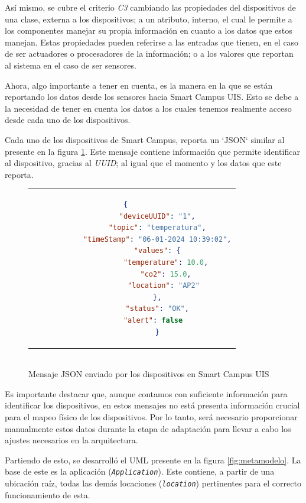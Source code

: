 Así mismo, se cubre el criterio \textit{C3} cambiando las propiedades del dispositivos de una clase, externa a los dispositivos; a un atributo, interno, el cual le permite a los componentes manejar su propia información en cuanto a los datos que estos manejan. Estas propiedades pueden referirse a las entradas que tienen, en el caso de ser actuadores o procesadores de la información; o a los valores que reportan al sistema en el caso de ser sensores.

Ahora, algo importante a tener en cuenta, es la manera en la que se están reportando los datos desde los sensores hacia Smart Campus UIS. Esto se debe a la necesidad de tener en cuenta los datos a los cuales tenemos realmente acceso desde cada uno de los dispositivos.

Cada uno de los dispositivos de Smart Campus, reporta un `JSON` similar al presente en la figura \ref{fig:jsonSCU}. Este mensaje contiene información que permite identificar al dispositivo, gracias al \textit{UUID}; al igual que el momento y los datos que este reporta.

\begin{figure}[H]
    \centering
    \caption{\\Mensaje JSON enviado por los dispositivos en Smart Campus UIS }
    \cite{SmartCampusGithub}
    \label{fig:jsonSCU}
    \begin{tabular}{c}
        \setstretch{1}
        \small
        \begin{lstlisting}[language=Json]
            {   
            "deviceUUID": "1",
            "topic": "temperatura",
            "timeStamp": "06-01-2024 10:39:02",
            "values": {
                "temperature": 10.0,
                "co2": 15.0,
                "location": "AP2" 
            },
            "status": "OK",
            "alert": false  
            }
        \end{lstlisting}
    \end{tabular}
\end{figure}

Es importante destacar que, aunque contamos con suficiente información para identificar los dispositivos, en estos mensajes no está presenta información crucial para el mapeo físico de los dispositivos. Por lo tanto, será necesario proporcionar manualmente estos datos durante la etapa de adaptación para llevar a cabo los ajustes necesarios en la arquitectura.

Partiendo de esto, se desarrolló el UML presente en la figura \ref{fig:metamodelo}. La base de este es la aplicación (\textit{\texttt{Application}}). Este contiene, a partir de una ubicación raíz, todas las demás locaciones (\textit{\texttt{location}}) pertinentes para el correcto funcionamiento de esta.

